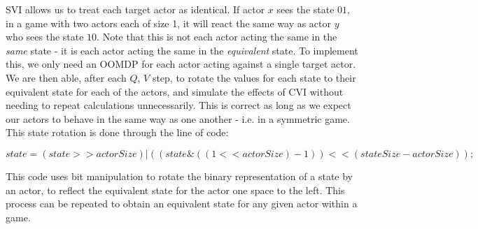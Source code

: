 SVI allows us to treat each target actor as identical. If actor $x$ sees the state $01$, in a game with two actors each of size 1, it will react the same way as actor $y$ who sees the state $10$. Note that this is not each actor acting the same in the \textit{same} state - it is each actor acting the same in the \textit{equivalent} state. To implement this, we only need an OOMDP for each actor acting against a single target actor. We are then able, after each $Q$, $V$ step, to rotate the values for each state to their equivalent state for each of the actors, and simulate the effects of CVI without needing to repeat calculations unnecessarily. This is correct as long as we expect our actors to behave in the same way as one another - i.e. in a symmetric game. This state rotation is done through the line of code:

\[state = (state >> actorSize) | ((state \& ((1<<actorSize)-1)) << (stateSize-actorSize));\]

This code uses bit manipulation to rotate the binary representation of a state by an actor, to reflect the equivalent state for the actor one space to the left. This process can be repeated to obtain an equivalent state for any given actor within a game.
